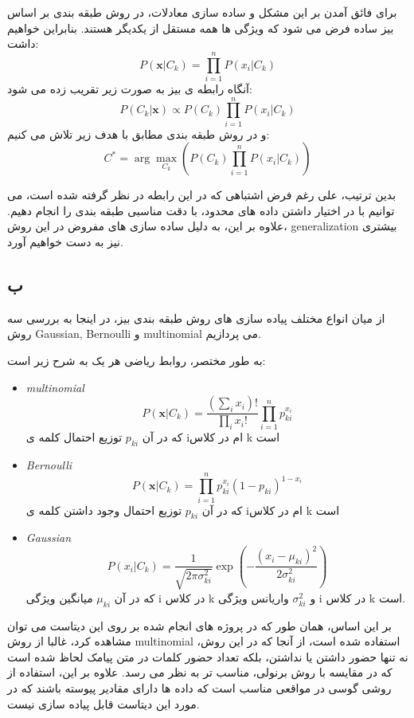 \documentclass{article}
\begin{document}
برای فائق آمدن بر این مشکل و ساده سازی معادلات، در روش طبقه بندی بر اساس بیز ساده فرض می شود که ویژگی ها همه مستقل از یکدیگر هستند. بنابراین خواهیم داشت:
\begin{equation}
    P(\mathbf{x} | C_k) = \prod_{i=1}^{n} P(x_i | C_k)
\end{equation}
 آنگاه رابطه ی بیز به صورت زیر تقریب زده می شود:
 \begin{equation}
     P(C_k | \mathbf{x}) \propto P(C_k) \prod_{i=1}^n P(x_i | C_k)
 \end{equation}
و در روش طبقه بندی مطابق با هدف زیر تلاش می کنیم:
\begin{equation}
    C^* = \arg\max_{C_k} \left( P(C_k) \prod_{i=1}^n P(x_i | C_k) \right)
\end{equation}

بدین ترتیب، علی رغم فرض اشتباهی که در این رابطه در نظر گرفته شده است، می توانیم با در اختیار داشتن داده های محدود، با دقت مناسبی طبقه بندی را انجام دهیم. علاوه بر این، به دلیل ساده سازی های مفروض در این روش، generalization بیشتری نیز به دست خواهیم آورد.

\subsection{ب}
از میان انواع مختلف پیاده سازی های روش طبقه بندی بیز، در اینجا به بررسی سه روش Gaussian, Bernoulli و multinomial می پردازیم.

به طور مختصر، روابط ریاضی هر یک به شرح زیر است:
\begin{itemize}
    \item \textit{multinomial}
    \[ P(\mathbf{x} | C_k) = \frac{(\sum_i x_i)!}{\prod_i x_i!} \prod_{i=1}^n p_{ki}^{x_i}
    \]
    که در آن 
    $p_{ki}$
    توزیع احتمال کلمه ی iام در کلاس k است

    \item \textit{Bernoulli}
    \[
    P(\mathbf{x} | C_k) = \prod_{i=1}^n p_{ki}^{x_i} (1-p_{ki})^{1-x_i} 
    \]
        که در آن 
    $p_{ki}$
    توزیع احتمال وجود داشتن کلمه ی iام در کلاس k است

    \item \textit{Gaussian}
    \[
    P(x_i | C_k) = \frac{1}{\sqrt{2\pi \sigma_{ki}^2}} \exp\left( -\frac{(x_i - \mu_{ki})^2}{2\sigma_{ki}^2} \right)
    \]
        که در آن 
        $\mu_{ki}$ میانگین ویژگی i در کلاس k
        و 
        $\sigma_{ki}^2$ واریانس ویژگی i در کلاس k است.
\end{itemize}

بر این اساس، همان طور که در پروژه های انجام شده بر روی این دیتاست می توان مشاهده کرد، غالبا از روش multinomial استفاده شده است، از آنجا که در این روش، نه تنها حضور داشتن یا نداشتن، بلکه تعداد حضور کلمات در متن پیامک لحاظ شده است که در مقایسه با روش برنولی، مناسب تر به نظر می رسد. علاوه بر این، استفاده از روشی گوسی در مواقعی مناسب است که داده ها دارای مقادیر پیوسته باشند که در مورد این دیتاست قابل پیاده سازی نیست.
\end{document}
